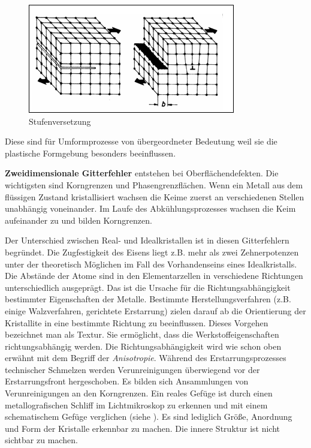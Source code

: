 \documentclass[12pt,a4paper,parskip,twoside,BCOR5mm,headsepline]{scrartcl}
\begin{document}
\begin{description*}
{\begin{enumerate*}
\begin{figure}
\centering
\includegraphics[width=.8\textwidth]{versetzung}
\caption[Stufenversetzung]{Stufenversetzung\autocite[50]{wk}}
\label{fig:versetzung}
\end{figure}

 Diese sind für Umformprozesse von übergeordneter Bedeutung weil sie die plastische Formgebung besonders beeinflussen.
\item \textbf{Zweidimensionale Gitterfehler} entstehen bei Oberflächendefekten. Die wichtigsten sind Korngrenzen und Phasengrenzflächen. Wenn ein Metall aus dem flüssigen Zustand kristallisiert wachsen die Keime zuerst an verschiedenen Stellen unabhängig voneinander. Im Laufe des Abkühlungsprozesses wachsen die Keim aufeinander zu und bilden Korngrenzen.
\end{enumerate*}

Der Unterschied zwischen Real- und Idealkristallen ist in diesen Gitterfehlern begründet. Die Zugfestigkeit des Eisens liegt  z.B. mehr als zwei Zehnerpotenzen unter der theoretisch Möglichen im Fall des Vorhandenseins eines Idealkristalls. Die Abstände der Atome sind in den Elementarzellen in verschiedene Richtungen unterschiedlich ausgeprägt. Das ist die Ursache für die Richtungsabhängigkeit bestimmter Eigenschaften der Metalle. Bestimmte Herstellungsverfahren (z.B. einige Walzverfahren, gerichtete Erstarrung) zielen darauf ab die Orientierung der Kristallite in eine bestimmte Richtung zu beeinflussen. Dieses Vorgehen bezeichnet man als Textur. Sie ermöglicht, dass die Werkstoffeigenschaften richtungsabhängig werden.  Die Richtungsabhängigkeit wird wie schon oben erwähnt mit dem Begriff der \emph{Anisotropie}. 
Während des Erstarrungsprozesses technischer Schmelzen werden Verunreinigungen überwiegend vor der Erstarrungsfront hergeschoben. Es bilden sich Ansammlungen von Verunreinigungen an den Korngrenzen. Ein reales Gefüge ist durch einen metallografischen Schliff im Lichtmikroskop zu erkennen und mit einem schematischem Gefüge verglichen (siehe ). Es sind lediglich Größe, Anordnung und Form der Kristalle erkennbar zu machen. Die innere Struktur ist nicht sichtbar zu machen.\autocite[3-6]{fu}

}
\end{description*}
\end{document}
